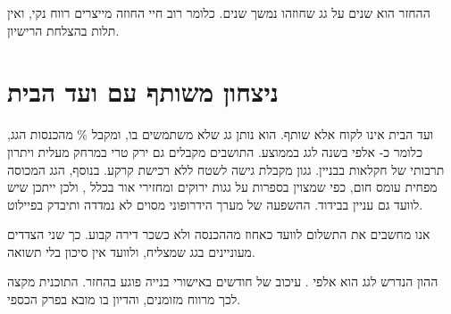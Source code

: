 \begin{insightbox}[תובנה]
ההחזר הוא \RRroofPayback{} שנים על גג שחוזהו נמשך \RRcontractYears{} שנים. כלומר רוב חיי החוזה מייצרים רווח נקי, ואין תלות בהצלחת הרישיון.
\end{insightbox}

\section{ניצחון משותף עם ועד הבית}\label{sec:win-win}

ועד הבית אינו לקוח אלא שותף. הוא נותן גג שלא משתמשים בו, ומקבל \RRrentShare\% מהכנסות הגג, כלומר כ-\RRroofRent{} אלפי \shekel{} בשנה לגג בממוצע. התושבים מקבלים גם ירק טרי במרחק מעלית ויתרון תרבותי של חקלאות בבניין. גגון מקבלת גישה לשטח ללא רכישת קרקע. בנוסף, הגג המכוסה מפחית עומס חום, כפי שמצוין בספרות על גגות ירוקים ומחזירי אור בכלל \cite{santamouris2014}, ולכן ייתכן שיש לוועד גם עניין בבידוד. ההשפעה של מערך הידרופוני מסוים לא נמדדה ותיבדק בפיילוט.

אנו מחשבים את התשלום לוועד כאחוז מההכנסה ולא כשכר דירה קבוע. כך שני הצדדים מעוניינים בגג שמצליח, ולוועד אין סיכון בלי תשואה.

\begin{riskbox}
ההון הנדרש לגג הוא \RRcapexRoof{} אלפי \shekel{}. עיכוב של חודשים באישורי בנייה פוגע בהחזר. התוכנית מקצה לכך מרווח מזומנים, והדיון בו מובא בפרק הכספי.
\end{riskbox}

